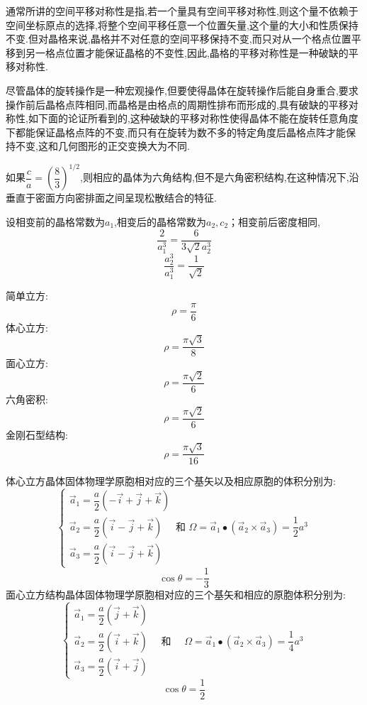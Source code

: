 \documentclass[UTF8,10pt, a4paper, oneside]{ctexart}
\begin{document}
    {通常所讲的空间平移对称性是指,若一个量具有空间平移对称性,则这个量不依赖于空间坐标原点的选择,将整个空间平移任意一个位置矢量,这个量的大小和性质保持不变.但对晶格来说,晶格并不对任意的空间平移保持不变,而只对从一个格点位置平移到另一格点位置才能保证晶格的不变性,因此,晶格的平移对称性是一种破缺的平移对称性.}

    {尽管晶体的旋转操作是一种宏观操作,但要使得晶体在旋转操作后能自身重合,要求操作前后晶格点阵相同,而晶格是由格点的周期性排布而形成的,具有破缺的平移对称性,如下面的论证所看到的,这种破缺的平移对称性使得晶体不能在旋转任意角度下都能保证晶格点阵的不变,而只有在旋转为数不多的特定角度后晶格点阵才能保持不变,这和几何图形的正交变换大为不同.}

    {如果$\dfrac{c}{a}=(\dfrac{8}{3})^{1/2}$,则相应的晶体为六角结构,但不是六角密积结构,在这种情况下,沿垂直于密面方向密排面之间呈现松散结合的特征.}
 
    {设相变前的晶格常数为$a_1$,相变后的晶格常数为$a_2,c_2$；相变前后密度相同,\[ \dfrac{2}{a_1^3}=\dfrac{6}{3\sqrt{2}a_2^3}\]
        \[ \dfrac{a_2^3}{a_1^3}=\dfrac{1}{\sqrt{2}}\]}

    {简单立方:\[\rho=\dfrac{\pi}{6}\]
    体心立方:\[\rho=\dfrac{\pi \sqrt{3}}{8}\]
    面心立方:\[\rho=\dfrac{\pi \sqrt{2} }{6}\]
    六角密积:\[\rho=\dfrac{\pi \sqrt{2} }{6}\]
    金刚石型结构:\[\rho=\dfrac{\pi \sqrt{3} }{16}\]}

    {体心立方晶体固体物理学原胞相对应的三个基矢以及相应原胞的体积分别为:\[\left\{\begin{array}{l}
     \vec{a}_{1}=\dfrac{a}{2}(-\vec{i}+\vec{j}+\vec{k}) \\
     \vec{a}_{2}=\dfrac{a}{2}(\vec{i}-\vec{j}+\vec{k}) \quad \text { 和 } \Omega=\vec{a}_{1} \bullet\left(\vec{a}_{2} \times \vec{a}_{3}\right)=\dfrac{1}{2} a^{3} \\
     \vec{a}_{3}=\dfrac{a}{2}(\vec{i}-\vec{j}+\vec{k}) 
    \end{array}\right.\]  \[\cos \theta=-\dfrac{1}{3}\] 面心立方结构晶体固体物理学原胞相对应的三个基矢和相应的原胞体积分别为:\[\left\{\begin{array}{l}
    \vec{a}_{1}=\dfrac{a}{2}(\vec{j}+\vec{k}) \\
    \vec{a}_{2}=\dfrac{a}{2}(\vec{i}+\vec{k}) \quad \text { 和 } \quad \Omega=\vec{a}_{1} \bullet\left(\vec{a}_{2} \times \vec{a}_{3}\right)=\dfrac{1}{4} a^{3}  \\
     \vec{a}_{3}=\dfrac{a}{2}(\vec{i}+\vec{j}) 
     \end{array}\right.\] \[ \cos \theta=\dfrac{1}{2}\]}
\end{document}
